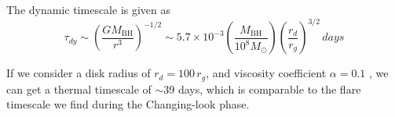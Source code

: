 


The dynamic timescale is given as 
\begin{equation}
\tau_{dy} \sim (\frac{G M_\mathrm{BH}}{r^3})^{-1/2} \sim 5.7\times 10^{-3} (\frac{M_\mathrm{BH}}{10^8M_{\odot}})(\frac{r_d}{r_g})^{3/2} \, days
\end{equation} 

If we consider a disk radius of $r_d =100\, r_g$, and viscosity coefficient $\alpha=0.1$ , we can get a thermal timescale of $\sim$39 days, which is comparable to the flare timescale we find during the Changing-look phase.




%


